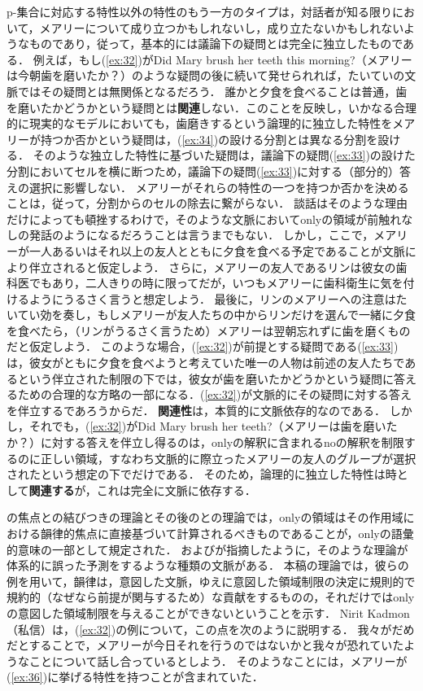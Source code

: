 \documentclass{goken}
\newcommand{\ori}[1]{\noindent\textcolor[gray]{0.7}{\fontsize{8pt}{8pt}\selectfont{\textsf{(p.~#1)}}} }
\begin{document}
p-集合に対応する特性以外の特性のもう一方のタイプは，対話者が知る限りにおいて，メアリーについて成り立つかもしれないし，成り立たないかもしれないようなものであり，従って，基本的には議論下の疑問とは完全に独立したものである．
例えば，もし(\ref{ex:32})がDid Mary brush her teeth this morning?（メアリーは今朝歯を磨いたか？）のような疑問の後に続いて発せられれば，たいていの文脈ではその疑問とは無関係となるだろう．
誰かと夕食を食べることは普通，歯を磨いたかどうかという疑問とは\textbf{関連}しない．このことを反映し，いかなる合理的に現実的なモデルにおいても，歯磨きするという論理的に独立した特性をメアリーが持つか否かという疑問は，(\ref{ex:34})の設ける分割とは異なる分割を設ける．
そのような独立した特性に基づいた疑問は，議論下の疑問(\ref{ex:33})の設けた分割においてセルを横に断つため，議論下の疑問(\ref{ex:33})に対する（部分的）答えの選択に影響しない．
メアリーがそれらの特性の一つを持つか否かを決めることは，従って，分割からのセルの除去に繋がらない．
談話はそのような理由だけによっても頓挫するわけで，そのような文脈においてonlyの領域が前触れなしの発話のようになるだろうことは言うまでもない．
しかし，ここで，メアリーが一人あるいはそれ以上の友人とともに夕食を食べる予定であることが文脈により伴立されると仮定しよう．
さらに，メアリーの友人であるリンは彼女の歯科医でもあり，二人きりの時に限ってだが，いつもメアリーに歯科衛生に気を付けるようにうるさく言うと想定しよう．
最後に，リンのメアリーへの注意はたいてい効を奏し，もしメアリーが友人たちの中からリンだけを選んで一緒に夕食を食べたら，（リンがうるさく言うため）メアリーは翌朝忘れずに歯を磨くものだと仮定しよう．
このような場合，(\ref{ex:32})が前提とする疑問である(\ref{ex:33})は，彼女がともに夕食を食べようと考えていた唯一の人物は前述の友人たちであるという伴立された制限の下では，彼女が歯を磨いたかどうかという疑問に答えるための合理的な方略の一部になる．(\ref{ex:32})が文脈的にその疑問に対する答えを伴立するであろうからだ．
\textbf{関連性}は，本質的に文脈依存的なのである．
しかし，それでも，(\ref{ex:32})がDid Mary brush her teeth?（メアリーは歯を磨いたか？）に対する答えを伴立し得るのは，onlyの解釈に含まれるnoの解釈を制限するのに正しい領域，すなわち文脈的に際立ったメアリーの友人のグループが選択されたという想定の下でだけである．
\ori{43}
そのため，論理的に独立した特性は時として\textbf{関連する}が，これは完全に文脈に依存する．

\citet{Rooth1985}の焦点との結びつきの理論とその後の\citet{vonStechow1991}と\citet{Krifka1992}の理論では，onlyの領域はその作用域における韻律的焦点に直接基づいて計算されるべきものであることが，onlyの語彙的意味の一部として規定された．
\citet{Vallduvi1990,Partee1976,vonFintel1994}および\citet{Roberts1995}が指摘したように，そのような理論が体系的に誤った予測をするような種類の文脈がある．
本稿の理論では，彼らの例を用いて，韻律は，意図した文脈，ゆえに意図した領域制限の決定に規則的で規約的（なぜなら前提が関与するため）な貢献をするものの，それだけではonlyの意図した領域制限を与えることができないということを示す．
Nirit Kadmon（私信）は，(\ref{ex:32})の例について，この点を次のように説明する．
我々がだめだとすることで，メアリーが今日それを行うのではないかと我々が恐れていたようなことについて話し合っているとしよう．
そのようなことには，メアリーが(\ref{ex:36})に挙げる特性を持つことが含まれていた．
\end{document}

